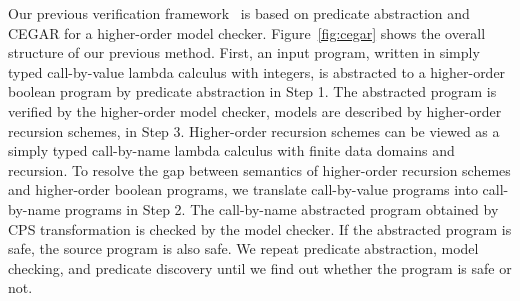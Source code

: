 Our previous verification framework~\cite{KobayashiPLDI2011} is based on
predicate abstraction and CEGAR for a higher-order model checker.
Figure~\ref{fig:cegar} shows the overall structure of our previous
method.  First, an input program, written in simply typed call-by-value
lambda calculus with integers, is abstracted to a higher-order boolean
program by predicate abstraction in Step 1.  The abstracted program is
verified by the higher-order model checker, models are described by
higher-order recursion schemes, in Step 3.  Higher-order recursion
schemes can be viewed as a simply typed call-by-name lambda calculus
with finite data domains and recursion.  To resolve the gap between
semantics of higher-order recursion schemes and higher-order boolean
programs, we translate call-by-value programs into call-by-name programs
in Step 2.  The call-by-name abstracted program obtained by CPS
transformation is checked by the model checker. If the abstracted
program is safe, the source program is also safe.  We repeat predicate
abstraction, model checking, and predicate discovery until we find out
whether the program is safe or not.


